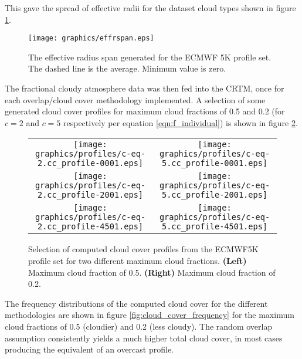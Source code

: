 This gave the spread of effective radii for the dataset cloud types shown in figure \ref{fig:ECMWF5K.effrspan}.

\begin{figure}[htp]
  \caption{The effective radius span generated for the ECMWF 5K profile set. The dashed line is the average. Minimum value is zero.}
  \label{fig:ECMWF5K.effrspan}
  \centering
  \texttt{[image: graphics/effrspan.eps]}
\end{figure}

The fractional cloudy atmosphere data was then fed into the CRTM, once for each overlap/cloud cover  methodology implemented. A selection of some generated cloud cover profiles for maximum cloud fractions of 0.5 and 0.2 (for $c = 2$ and $c = 5$ respectively per equation \ref{eqn:f_individual}) is shown in figure \ref{fig:cc_profile_selection}.

\begin{figure}[H]
  \caption{Selection of computed cloud cover profiles from the ECMWF5K profile set for two different maximum cloud fractions. \textbf{(Left)} Maximum cloud fraction of 0.5. \textbf{(Right)} Maximum cloud fraction of 0.2. }
  \label{fig:cc_profile_selection}
  \centering
  \begin{tabular}{c c}
    \texttt{[image: graphics/profiles/c-eq-2.cc\_profile-0001.eps]} &
    \texttt{[image: graphics/profiles/c-eq-5.cc\_profile-0001.eps]}\\
    \texttt{[image: graphics/profiles/c-eq-2.cc\_profile-2001.eps]} &
    \texttt{[image: graphics/profiles/c-eq-5.cc\_profile-2001.eps]}\\
    \texttt{[image: graphics/profiles/c-eq-2.cc\_profile-4501.eps]} &
    \texttt{[image: graphics/profiles/c-eq-5.cc\_profile-4501.eps]}
  \end{tabular}
\end{figure}

The frequency distributions of the computed cloud cover for the different methodologies are shown in figure \ref{fig:cloud_cover_frequency} for the maximum cloud fractions of 0.5 (cloudier) and 0.2 (less cloudy). The random overlap assumption consistently yields a much higher total cloud cover, in most cases producing the equivalent of an overcast profile.

